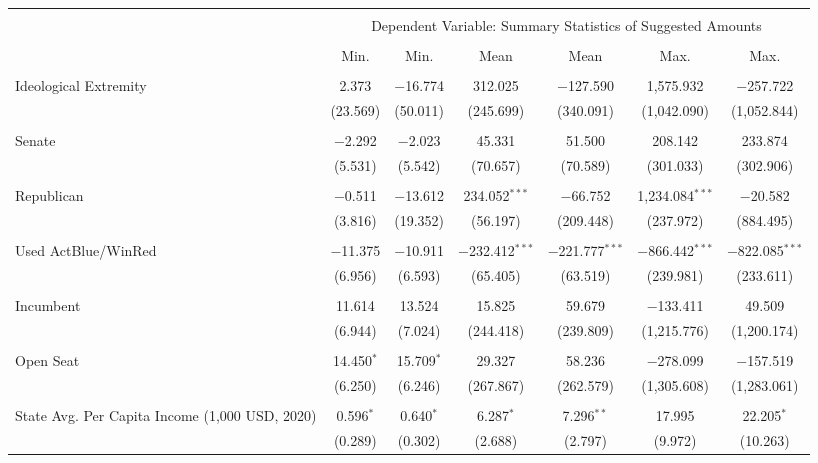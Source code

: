 
\begin{tabular}{@{\extracolsep{5pt}}lcccccc} 
\\[-1.8ex]\hline 
\hline \\[-1.8ex] 
 & \multicolumn{6}{c}{Dependent Variable: Summary Statistics of Suggested Amounts} \\ 
\cline{2-7} 
\\[-1.8ex] & Min. & Min. & Mean & Mean & Max. & Max. \\ 
\hline \\[-1.8ex] 
 Ideological Extremity & 2.373 & $-$16.774 & 312.025 & $-$127.590 & 1,575.932 & $-$257.722 \\ 
  & (23.569) & (50.011) & (245.699) & (340.091) & (1,042.090) & (1,052.844) \\ 
  & & & & & & \\ 
 Senate & $-$2.292 & $-$2.023 & 45.331 & 51.500 & 208.142 & 233.874 \\ 
  & (5.531) & (5.542) & (70.657) & (70.589) & (301.033) & (302.906) \\ 
  & & & & & & \\ 
 Republican & $-$0.511 & $-$13.612 & 234.052$^{***}$ & $-$66.752 & 1,234.084$^{***}$ & $-$20.582 \\ 
  & (3.816) & (19.352) & (56.197) & (209.448) & (237.972) & (884.495) \\ 
  & & & & & & \\ 
 Used ActBlue/WinRed & $-$11.375 & $-$10.911 & $-$232.412$^{***}$ & $-$221.777$^{***}$ & $-$866.442$^{***}$ & $-$822.085$^{***}$ \\ 
  & (6.956) & (6.593) & (65.405) & (63.519) & (239.981) & (233.611) \\ 
  & & & & & & \\ 
 Incumbent & 11.614 & 13.524 & 15.825 & 59.679 & $-$133.411 & 49.509 \\ 
  & (6.944) & (7.024) & (244.418) & (239.809) & (1,215.776) & (1,200.174) \\ 
  & & & & & & \\ 
 Open Seat & 14.450$^{*}$ & 15.709$^{*}$ & 29.327 & 58.236 & $-$278.099 & $-$157.519 \\ 
  & (6.250) & (6.246) & (267.867) & (262.579) & (1,305.608) & (1,283.061) \\ 
  & & & & & & \\ 
 State Avg. Per Capita Income (1,000 USD, 2020) & 0.596$^{*}$ & 0.640$^{*}$ & 6.287$^{*}$ & 7.296$^{**}$ & 17.995 & 22.205$^{*}$ \\ 
  & (0.289) & (0.302) & (2.688) & (2.797) & (9.972) & (10.263) \\ 

\end{tabular}
